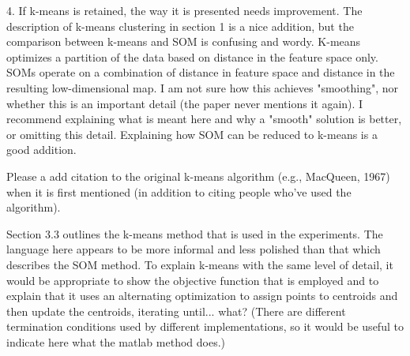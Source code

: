 4. If k-means is retained, the way it is presented needs improvement. The description of k-means clustering in section 1 is a nice addition, but the comparison between k-means and SOM is confusing and wordy. K-means optimizes a partition of the data based on distance in the feature space only.  SOMs operate on a combination of distance in feature space and distance in the resulting low-dimensional map.  I am not sure how this achieves "smoothing", nor whether this is an important detail (the paper never mentions it again).  I recommend explaining what is meant here and why a "smooth" solution is better, or omitting this detail.  Explaining how SOM can be reduced to k-means is a good addition.

Please a add citation to the original k-means algorithm (e.g., MacQueen, 1967) when it is first mentioned (in addition to citing people who've used the algorithm).

Section 3.3 outlines the k-means method that is used in the experiments.  The language here appears to be more informal and less polished than that which describes the SOM method.  To explain k-means with the same level of detail, it would be appropriate to show the objective function that is employed and to explain that it uses an alternating optimization to assign points to centroids and then update the centroids, iterating until... what?  (There are different termination conditions used by different implementations, so it would be useful to indicate here what the matlab method does.)